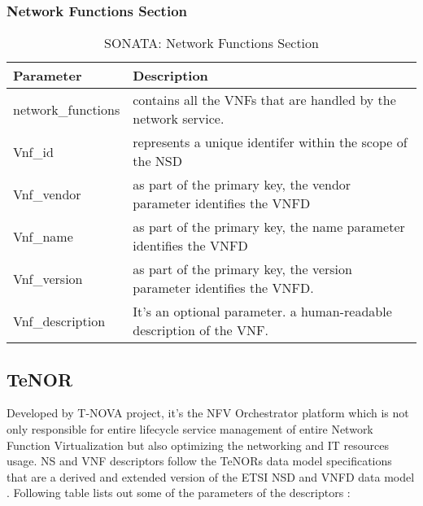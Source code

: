 \subsubsection{Network Functions Section}
    \begin{table}[h]
    \centering
    \begin{tabular}{ |p{4cm}|p{10cm}|}
        \hline
        \textbf{Parameter} & \textbf{Description} \\
        \hline
         
         network\_functions & contains all the VNFs that are handled by the network service. \\
         \hline
         Vnf\_id & represents a unique identifer within the scope of the NSD \\
         \hline
         Vnf\_vendor & as part of the primary key, the vendor parameter identifies the VNFD \\
         \hline
         Vnf\_name & as part of the primary key, the name parameter identifies the VNFD \\
         \hline
         Vnf\_version & as part of the primary key, the version parameter identifies the VNFD.\\
         \hline
         Vnf\_description & It’s an optional parameter. a human-readable description of the VNF.\\
         \hline
    \end{tabular}
    \caption{SONATA: Network Functions Section}
    \label{tab:SONATA_NF_section}
 \end{table}


\subsection{TeNOR}
Developed by T-NOVA project, it’s the NFV Orchestrator platform which is not only responsible for entire lifecycle service management of entire Network Function Virtualization but also optimizing the networking and IT resources usage. NS and VNF descriptors follow the TeNORs data model specifications that are a derived and extended version of the ETSI NSD and VNFD data model \cite{de2018network}. Following table lists out some of the parameters of the descriptors \cite{TeNorSchemaDocumentation}:

